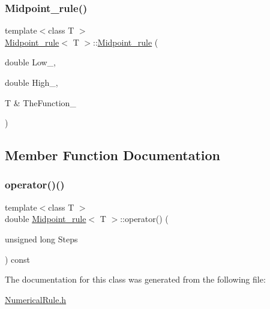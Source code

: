 \subsubsection{\texorpdfstring{Midpoint\+\_\+rule()}{Midpoint\_rule()}}
{\footnotesize\ttfamily template$<$class T $>$ \\
\hyperlink{classMidpoint__rule}{Midpoint\+\_\+rule}$<$ T $>$\+::\hyperlink{classMidpoint__rule}{Midpoint\+\_\+rule} (\begin{DoxyParamCaption}\item[{double}]{Low\+\_\+,  }\item[{double}]{High\+\_\+,  }\item[{T \&}]{The\+Function\+\_\+ }\end{DoxyParamCaption})\hspace{0.3cm}{\ttfamily [inline]}}



\subsection{Member Function Documentation}
\hypertarget{classMidpoint__rule_ab22f2f3e9756e267728e69a9757f9142}{}\label{classMidpoint__rule_ab22f2f3e9756e267728e69a9757f9142} 
\subsubsection{\texorpdfstring{operator()()}{operator()()}}
{\footnotesize\ttfamily template$<$class T $>$ \\
double \hyperlink{classMidpoint__rule}{Midpoint\+\_\+rule}$<$ T $>$\+::operator() (\begin{DoxyParamCaption}\item[{unsigned long}]{Steps }\end{DoxyParamCaption}) const\hspace{0.3cm}{\ttfamily [inline]}}



The documentation for this class was generated from the following file\+:\begin{DoxyCompactItemize}
\item 
\hyperlink{NumericalRule_8h}{Numerical\+Rule.\+h}\end{DoxyCompactItemize}
